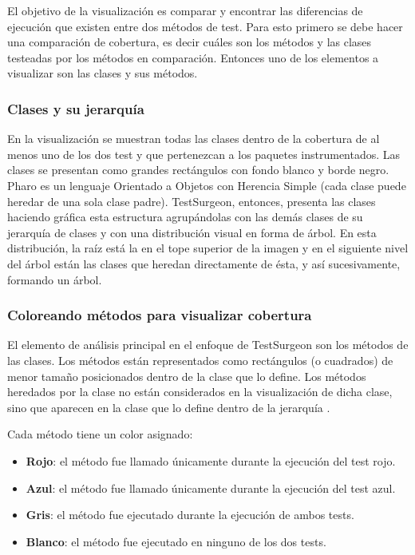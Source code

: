 \par El objetivo de la visualización es comparar y encontrar las diferencias de ejecución que existen entre dos métodos de test. Para esto primero se debe hacer una comparación de cobertura, es decir cuáles son los métodos y las clases testeadas por los métodos en comparación. Entonces uno de los elementos a visualizar son las clases y sus métodos. 

\subsubsection{Clases y su jerarquía}

\par En la visualización se muestran todas las clases dentro de la cobertura de al menos uno de los dos test y que pertenezcan a los paquetes instrumentados. Las clases se presentan como grandes rectángulos con fondo blanco y borde negro. Pharo es un lenguaje Orientado a Objetos con Herencia Simple (cada clase puede heredar de una sola clase padre). TestSurgeon, entonces, presenta las clases haciendo gráfica esta estructura agrupándolas con las demás clases de su jerarquía de clases y con una distribución visual en forma de árbol. En esta distribución, la raíz está la en el tope superior de la imagen y en el siguiente nivel del árbol están las clases que heredan directamente de ésta, y así sucesivamente, formando un árbol.


\subsubsection{Coloreando métodos para visualizar cobertura}

\par El elemento de análisis principal en el enfoque de TestSurgeon son los métodos de las clases. Los métodos están representados como rectángulos (o cuadrados) de menor tamaño posicionados dentro de la clase que lo define.  Los métodos heredados por la clase no están considerados en la visualización de dicha clase, sino que aparecen en la clase que lo define dentro de la jerarquía
.  

\par Cada método tiene un color asignado:
\begin{itemize}
\item {\bf Rojo}: el método fue llamado únicamente durante la ejecución del test rojo.
\item {\bf Azul}: el método fue llamado únicamente durante la ejecución del test azul.
\item {\bf Gris}: el método fue ejecutado durante la ejecución de ambos tests.
\item {\bf Blanco}: el método fue ejecutado en ninguno de los dos tests.
\end{itemize}


